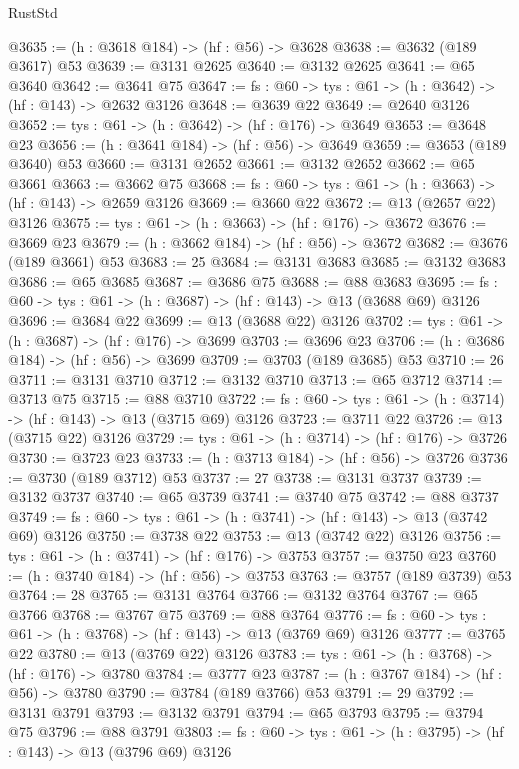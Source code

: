 \begin{lexlean}{RustStd}
\begin{coremodule}
{\begin{coremodule}
{{{{{{{{{{{{@3635 := (h : @3618 @184) -> (hf : @56) -> @3628
@3638 := @3632 (@189 @3617) @53
@3639 := @3131 @2625
@3640 := @3132 @2625
@3641 := @65 @3640
@3642 := @3641 @75
@3647 := {fs : @60} -> {tys : @61} -> (h : @3642) -> (hf : @143) -> @2632 @3126
@3648 := @3639 @22
@3649 := @2640 @3126
@3652 := {tys : @61} -> (h : @3642) -> (hf : @176) -> @3649
@3653 := @3648 @23
@3656 := (h : @3641 @184) -> (hf : @56) -> @3649
@3659 := @3653 (@189 @3640) @53
@3660 := @3131 @2652
@3661 := @3132 @2652
@3662 := @65 @3661
@3663 := @3662 @75
@3668 := {fs : @60} -> {tys : @61} -> (h : @3663) -> (hf : @143) -> @2659 @3126
@3669 := @3660 @22
@3672 := @13 (@2657 @22) @3126
@3675 := {tys : @61} -> (h : @3663) -> (hf : @176) -> @3672
@3676 := @3669 @23
@3679 := (h : @3662 @184) -> (hf : @56) -> @3672
@3682 := @3676 (@189 @3661) @53
@3683 := 25
@3684 := @3131 @3683
@3685 := @3132 @3683
@3686 := @65 @3685
@3687 := @3686 @75
@3688 := @88 @3683
@3695 := {fs : @60} -> {tys : @61} -> (h : @3687) -> (hf : @143) -> @13 (@3688 @69) @3126
@3696 := @3684 @22
@3699 := @13 (@3688 @22) @3126
@3702 := {tys : @61} -> (h : @3687) -> (hf : @176) -> @3699
@3703 := @3696 @23
@3706 := (h : @3686 @184) -> (hf : @56) -> @3699
@3709 := @3703 (@189 @3685) @53
@3710 := 26
@3711 := @3131 @3710
@3712 := @3132 @3710
@3713 := @65 @3712
@3714 := @3713 @75
@3715 := @88 @3710
@3722 := {fs : @60} -> {tys : @61} -> (h : @3714) -> (hf : @143) -> @13 (@3715 @69) @3126
@3723 := @3711 @22
@3726 := @13 (@3715 @22) @3126
@3729 := {tys : @61} -> (h : @3714) -> (hf : @176) -> @3726
@3730 := @3723 @23
@3733 := (h : @3713 @184) -> (hf : @56) -> @3726
@3736 := @3730 (@189 @3712) @53
@3737 := 27
@3738 := @3131 @3737
@3739 := @3132 @3737
@3740 := @65 @3739
@3741 := @3740 @75
@3742 := @88 @3737
@3749 := {fs : @60} -> {tys : @61} -> (h : @3741) -> (hf : @143) -> @13 (@3742 @69) @3126
@3750 := @3738 @22
@3753 := @13 (@3742 @22) @3126
@3756 := {tys : @61} -> (h : @3741) -> (hf : @176) -> @3753
@3757 := @3750 @23
@3760 := (h : @3740 @184) -> (hf : @56) -> @3753
@3763 := @3757 (@189 @3739) @53
@3764 := 28
@3765 := @3131 @3764
@3766 := @3132 @3764
@3767 := @65 @3766
@3768 := @3767 @75
@3769 := @88 @3764
@3776 := {fs : @60} -> {tys : @61} -> (h : @3768) -> (hf : @143) -> @13 (@3769 @69) @3126
@3777 := @3765 @22
@3780 := @13 (@3769 @22) @3126
@3783 := {tys : @61} -> (h : @3768) -> (hf : @176) -> @3780
@3784 := @3777 @23
@3787 := (h : @3767 @184) -> (hf : @56) -> @3780
@3790 := @3784 (@189 @3766) @53
@3791 := 29
@3792 := @3131 @3791
@3793 := @3132 @3791
@3794 := @65 @3793
@3795 := @3794 @75
@3796 := @88 @3791
@3803 := {fs : @60} -> {tys : @61} -> (h : @3795) -> (hf : @143) -> @13 (@3796 @69) @3126
}}}}}}}}}}}}
\end{coremodule}}
\end{coremodule}
\end{lexlean}

